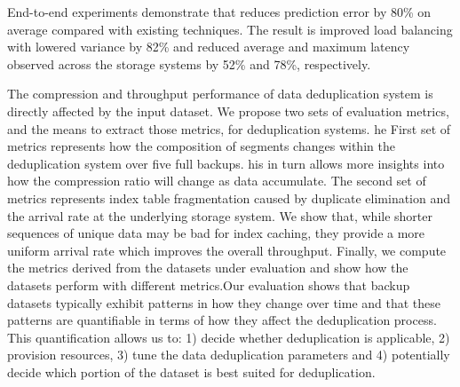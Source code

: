 End-to-end experiments demonstrate that \romano reduces prediction error by 80\% on average compared with existing techniques.
The result is improved load balancing with lowered variance by 82\% and reduced average and maximum latency observed across the storage systems by 52\% and 78\%, respectively.


The compression and throughput performance of data deduplication system is directly affected by the input dataset. 
We propose two sets of evaluation metrics, and the means to extract those metrics, for deduplication systems. 
he First set of metrics represents how the composition of segments changes within the deduplication system over five full backups. 
his in turn allows more insights into how the compression ratio will change as data accumulate.
The second set of metrics represents index table fragmentation caused by duplicate elimination and the arrival rate at the underlying storage system.
We show that, while shorter sequences of unique data may be bad for index caching, they provide a more uniform arrival rate which improves the overall throughput.
Finally, we compute the metrics derived from the datasets  under evaluation and show how the datasets perform with different metrics.Our evaluation shows that backup datasets typically exhibit patterns in how they change over time and that these patterns are quantifiable in terms of how they affect the deduplication process.
This quantification allows us to: 1) decide whether deduplication is applicable, 2) provision resources, 3) tune the data deduplication parameters and 4) potentially decide which portion of the dataset is best suited for deduplication.


